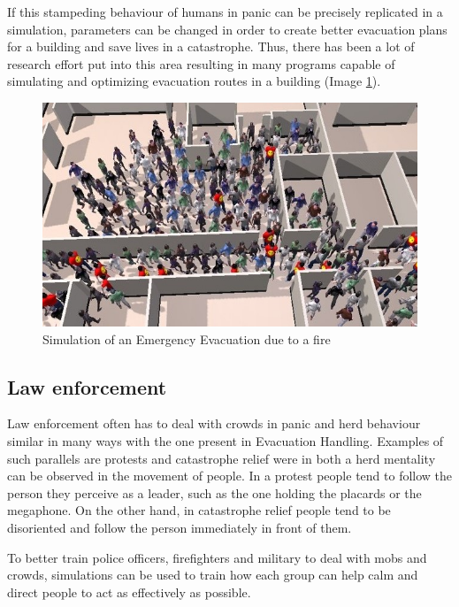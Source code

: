 \documentclass[sigconf]{acmart}
\begin{document}
If this stampeding behaviour  of humans in panic  can be precisely replicated in a simulation, parameters
can be changed in order to create better evacuation plans for a building and save lives in a catastrophe.
Thus, there has been a lot of research effort put into this area resulting in many programs capable of
simulating and optimizing evacuation routes in a building (Image \ref{fig:crowdFire}).

\begin{figure}[h]
  \centering
  \includegraphics[width=\linewidth]{images/evacuation_simulation.jpg}
  \caption{Simulation of an Emergency Evacuation due to a fire }
  \label{fig:crowdFire}
\end{figure}

\subsection{Law enforcement}

Law enforcement often has to deal with crowds in panic and herd behaviour similar in many ways with the one
present in Evacuation Handling. Examples of such parallels are protests and catastrophe relief were
in both a herd mentality can be observed in the movement of people. In a protest people tend to follow the
person they perceive as a leader, such as the one holding the placards or the megaphone. On the other hand,
in catastrophe relief people tend to be disoriented and follow the person immediately in front of them.

To better train police officers, firefighters and military to deal with mobs and crowds, simulations can be
used to train how each group can help calm and direct people to act as effectively as possible.
\end{document}
